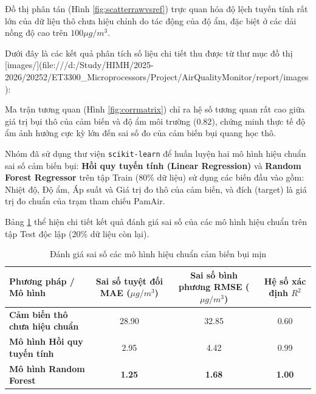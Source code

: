 Đồ thị phân tán (Hình \ref{fig:scatterrawvsref}) trực quan hóa độ lệch tuyến tính rất lớn của dữ liệu thô chưa hiệu chỉnh do tác động của độ ẩm, đặc biệt ở các dải nồng độ cao trên $100 \mu g/m^3$.

Dưới đây là các kết quả phân tích số liệu chi tiết thu được từ thư mục đồ thị [images/](file:///d:/Study/HIMH/2025-2026/20252/ET3300\_Microprocessors/Project/AirQualityMonitor/report/images):

Ma trận tương quan (Hình \ref{fig:corrmatrix}) chỉ ra hệ số tương quan rất cao giữa giá trị bụi thô của cảm biến và độ ẩm môi trường ($0.82$), chứng minh thực tế độ ẩm ảnh hưởng cực kỳ lớn đến sai số đo của cảm biến bụi quang học thô.

Nhóm đã sử dụng thư viện \texttt{scikit-learn} để huấn luyện hai mô hình hiệu chuẩn sai số cảm biến bụi: \textbf{Hồi quy tuyến tính (Linear Regression)} và \textbf{Random Forest Regressor} trên tập Train (80\% dữ liệu) sử dụng các biến đầu vào gồm: Nhiệt độ, Độ ẩm, Áp suất và Giá trị đo thô của cảm biến, và đích (target) là giá trị đo chuẩn của trạm tham chiếu PamAir. 

Bảng \ref{tab:mlperformance} thể hiện chi tiết kết quả đánh giá sai số của các mô hình hiệu chuẩn trên tập Test độc lập (20\% dữ liệu còn lại).

\begin{table}[H]
\centering
\caption{Đánh giá sai số các mô hình hiệu chuẩn cảm biến bụi mịn}
\label{tab:mlperformance}
\begin{small}
\begin{tabular}{lccc}
\toprule
\textbf{Phương pháp / Mô hình} & \textbf{Sai số tuyệt đối MAE ($\mu g/m^3$)} & \textbf{Sai số bình phương RMSE ($\mu g/m^3$)} & \textbf{Hệ số xác định $R^2$} \\
\midrule
\textbf{Cảm biến thô chưa hiệu chuẩn} & 28.90 & 32.85 & 0.60 \\
\textbf{Mô hình Hồi quy tuyến tính} & 2.95 & 4.42 & 0.99 \\
\textbf{Mô hình Random Forest} & \textbf{1.25} & \textbf{1.68} & \textbf{1.00} \\
\bottomrule
\end{tabular}
\end{small}
\end{table}

